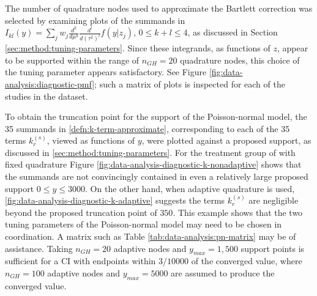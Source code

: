 \documentclass[12pt]{article}
\newcommand{\F}{I}
\newcommand{\z}{z}
\newcommand{\y}{y}
\renewcommand{\k}{k}
\newcommand{\kterm}{\k_r^{(s)}}
\newcommand{\nGH}{n_{GH}}
\newcommand{\w}{w}
\newcommand{\comment}[2][red]{%
 \iftoggle{commenttoggle}{%
  {\normalsize{\color{#1}{#2}}\normalsize}%
 }{%
 }%
}
\begin{document}
The number of quadrature nodes used to approximate the Bartlett
correction was selected by examining plots of the summands in
$\F_{kl}(\y)=\sum_{j} \w_j \frac{d^k}{d\mu^k}\frac{d^l}{d(\tau^2)^l}
f(y|\z_j)$, $0\le k+l \le 4$, as discussed in Section
\ref{sec:method:tuning-parameters}. Since these integrands, as functions of $z$,
appear to be supported within the range of $\nGH=20$ quadrature nodes,
this choice of the tuning parameter appears satisfactory. See Figure
\ref{fig:data-analysis:diagnostic-pmf}; such a matrix of plots is
inspected for each of the studies in the dataset.

To obtain the truncation point for the support of the Poisson-normal
model, the 35 summands in \eqref{defn:k-term-approximate},
corresponding to each of the 35 terms $\kterm$, viewed as functions of
$\y$, were plotted against a proposed support, as discussed in
\ref{sec:method:tuning-parameters}.  For the treatment group of \citet{niel:08}
with fixed quadrature Figure
\ref{fig:data-analysis-diagnostic-k-nonadaptive} shows that the
summands are not convincingly contained in even a relatively large proposed support
$0\le\y\le 3000$. On the other hand, when adaptive quadrature is used,
\ref{fig:data-analysis-diagnostic-k-adaptive} suggests the terms
$\kterm$ are negligible beyond the proposed truncation point of $350$. This
example shows that the two tuning parameters of the Poisson-normal model may need to be chosen in coordination. A
matrix such as Table \ref{tab:data-analysis:pn-matrix} may be of assistance.
Taking $\nGH=20$ adaptive nodes and $\y_{max}=1,500$ support points is sufficient for a CI with endpoints within $3/10000$ of the converged value, where $\nGH=100$ adaptive nodes and $\y_{max}=5000$ are assumed to produce the converged value. \comment[green]{The treatment arm is evidently more challenging than the control arm, with relatively few rare events. In the latter case only
 $\nGH=10$ adaptive nodes and $\y_{max}=400$ are needed to achieve a similar proximity to the converged value}
\end{document}
